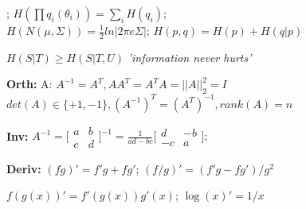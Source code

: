 ; \;
$H(\prod q_i(\theta_i)) = \sum_i H(q_i)$; \\
$H(N(\mu, \Sigma)) = \frac{1}{2}  ln|2\pi e \Sigma|$; $H(p,q) = H(p) + H(q | p)$

$H(S | T) \geq H(S | T, U)$ \textit{'information never hurts'}

\textbf{Orth:} \; A: $A^{-1}=A^T,AA^T=A^TA=||A||_2^2=I$\\
$det(A)\in\{+1,-1\}, (A^{-1})^T=(A^T)^{-1}, rank(A)=n$

\textbf{Inv:} \; $A^{-1}=
\big[
\begin{smallmatrix}
a&b \\ 
c&d
\end{smallmatrix}\big]^{-1}=
\frac{1}{ad-bc}
\big[
\begin{smallmatrix}
d&-b \\ 
-c&a
\end{smallmatrix}\big];
$

\textbf{Deriv:} \;
$(fg)' = f'g + fg'$; $(f/g)' = (f'g - fg')/g^2$

$f(g(x))' = f'(g(x))g'(x)$; $\log(x)' = 1/x$

\iffalse
\textbf{Eigdec:} \;
$A,Q \in \mathbb{R}^{n\times n}, A=Q\Lambda Q^{-1},\! \Lambda = diag(\lambda_i)$\\
$Q=[v_1,..,v_n], \text{(col's are e-vec.)}$

if all $\lambda_i\geq0: A^{-1}=Q\Lambda^{-1}Q^{-1},\Lambda^{-1}=diag(\frac{1}{\lambda_i})$\\
if $A=A^T\text{(symm.) and }x^TAx\geq0 \forall x \neq 0 \rightarrow psd$

\textbf{SVD:} \;
$X\in \mathbb{R}^{n\times p}, U\in \mathbb{R}^{n\times n}, S\in \mathbb{R}^{n\times p},
V\in \mathbb{R}^{p\times p}$\\
$X=USV^T=\sum_{k=1}^{rank(X)}\sigma_{k,k}u_k (v_k)^T,\!${\tiny{($U^TU=V^TV=I$)}}\\
$X^TX=VS^TU^TUSV^T=VS^TSV^T=V\Sigma V^T$\\
$\Sigma = diag(\sigma_1^2,..,\sigma_n^2);\sigma_i^2=\lambda_i; \forall \lambda_i \geq 0$
\fi




